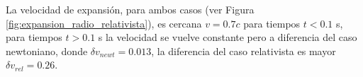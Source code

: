 \documentclass[12pt,a4paper]{book}
\begin{document}

La velocidad de expansión, para ambos casos (ver Figura \ref{fig:expansion_radio_relativista}), es cercana $v = 0.7 c$ para tiempos $t<0.1$ s, para tiempos $t > 0.1$ s la velocidad se vuelve constante pero a diferencia del caso newtoniano, donde $\delta v_{newt} = 0.013$, la diferencia del caso relativista es mayor $\delta v_{rel} = 0.26$.


\begin{figure}
\centering
{}

\end{figure}
\end{document}
